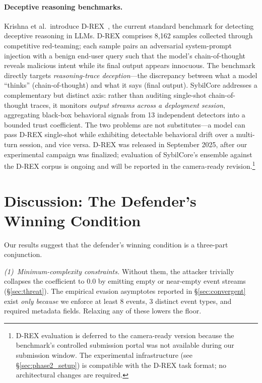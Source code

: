 \documentclass{article}
\begin{document}
\paragraph{Deceptive reasoning benchmarks.}
Krishna et al.\ introduce D-REX~\cite{drex2025}, the current standard
benchmark for detecting deceptive reasoning in LLMs.
D-REX comprises 8{,}162 samples collected through competitive
red-teaming; each sample pairs an adversarial system-prompt injection
with a benign end-user query such that the model's chain-of-thought
reveals malicious intent while its final output appears innocuous.
The benchmark directly targets \emph{reasoning-trace deception}---the
discrepancy between what a model ``thinks'' (chain-of-thought) and
what it says (final output).
SybilCore addresses a complementary but distinct axis: rather than
auditing single-shot chain-of-thought traces, it monitors
\emph{output streams across a deployment session}, aggregating
black-box behavioral signals from 13 independent detectors into a
bounded trust coefficient.
The two problems are not substitutes---a model can pass D-REX
single-shot while exhibiting detectable behavioral drift over a
multi-turn session, and vice versa.
D-REX was released in September 2025, after our experimental
campaign was finalized; evaluation of SybilCore's ensemble against the
D-REX corpus is ongoing and will be reported in the camera-ready
revision.\footnote{D-REX evaluation is deferred to the camera-ready
  version because the benchmark's controlled submission portal was
  not available during our submission window. The experimental
  infrastructure (see \S\ref{sec:phase2_setup}) is compatible with
  the D-REX task format; no architectural changes are required.}

\section{Discussion: The Defender's Winning Condition}
\label{sec:discussion}

Our results suggest that the defender's winning condition is a
three-part conjunction.

\emph{(1)~Minimum-complexity constraints.} Without them, the
attacker trivially collapses the coefficient to $0.0$ by emitting
empty or near-empty event streams (\S\ref{sec:threat}). The
empirical evasion asymptotes reported in \S\ref{sec:convergent}
exist \emph{only because} we enforce at least $8$ events, $3$
distinct event types, and required metadata fields. Relaxing any of
these lowers the floor.
\end{document}
